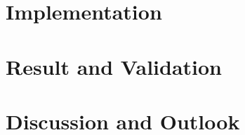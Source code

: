 \documentclass[13pt,pdftex,a4paper]{scrreprt}
\begin{document}
\chapter{Implementation}
\label{implementation}


\chapter{Result and Validation}
\label{result}


\chapter{Discussion and Outlook}
\label{discussion}


\newpage
\renewcommand\chaptername{}
\printbibliography

%
\end{document}
